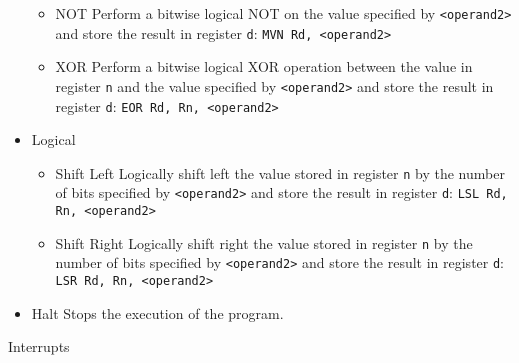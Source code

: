 \begin{itemize}
\begin{itemize}
      \item NOT
        \subitem Perform a bitwise logical NOT on the value specified by \verb|<operand2>| and store the result in register \verb|d|: \verb|MVN Rd, <operand2>|
      \item XOR
        \subitem Perform a bitwise logical XOR operation between the value in register \verb|n| and the value specified by \verb|<operand2>| and store the result in register \verb|d|: \verb|EOR Rd, Rn, <operand2>|
    \end{itemize}
    \item Logical
    \begin{itemize}
      \setlength{\itemsep}{0em}
      \item Shift Left
        \subitem Logically shift left the value stored in register \verb|n| by the number of bits specified by \verb|<operand2>| and store the result in register \verb|d|: \verb|LSL Rd, Rn, <operand2>|
      \item Shift Right
        \subitem Logically shift right the value stored in register \verb|n| by the number of bits specified by \verb|<operand2>| and store the result in register \verb|d|: \verb|LSR Rd, Rn, <operand2>|
    \end{itemize}
    \item Halt
      \subitem Stops the execution of the program.
  \end{itemize}
  Interrupts
  

